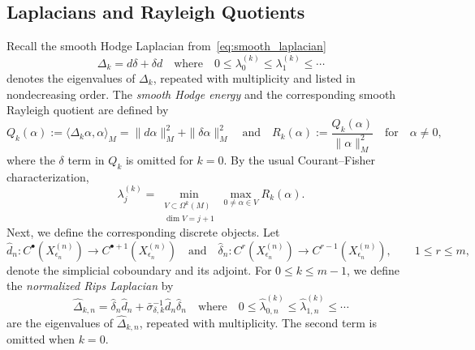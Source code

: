\documentclass[11pt,reqno]{amsproc}
\numberwithin{equation}{section}
\newcommand{\hd}{\hat{d}}
\newcommand{\hdelta}{\hat{\delta}}
\newcommand{\andd}{\quad \text{and} \quad}
\theoremstyle{definition}
\theoremstyle{plain}
\begin{document}
    
    
    


    \subsection{Laplacians and Rayleigh Quotients}

    Recall the smooth Hodge Laplacian from~\eqref{eq:smooth_laplacian}
    \begin{equation}
        \Delta_k=d\delta+\delta d \quad \text{where} \quad 0\leq \lambda^{(k)}_0\leq \lambda^{(k)}_1\leq \cdots
    \end{equation}
    denotes the eigenvalues of $\Delta_k$, repeated with multiplicity and listed in nondecreasing order. The \emph{smooth Hodge energy} and the corresponding smooth Rayleigh quotient are defined by 
    \begin{equation} \label{eq:smooth_rayleigh_sec7}
        Q_k(\alpha)
        := \langle \Delta_k\alpha,\alpha\rangle_M
        = \|d\alpha\|_M^2+\|\delta\alpha\|_M^2 \andd R_k(\alpha):=\frac{Q_k(\alpha)}{\|\alpha\|_M^2} \quad \text{for} \quad  \alpha\neq 0,
    \end{equation}
    \label{not:smooth_rayleigh}
    where the $\delta$ term in $Q_k$ is omitted for $k = 0$.  
    By the usual Courant--Fisher characterization,
    \begin{equation} \label{eq:smooth_minmax_sec7}
        \lambda^{(k)}_j
        =
        \min_{\substack{V\subset \Omega^k(M)\\ \dim V=j+1}}
        \max_{0\neq \alpha\in V} R_k(\alpha).
    \end{equation}
    Next, we define the corresponding discrete objects. Let
    \begin{equation}
        \hd_n:C^\bullet(X^{(n)}_{\epsilon_n})\to C^{\bullet+1}(X^{(n)}_{\epsilon_n})
        \andd
        \hdelta_n : C^r(X^{(n)}_{\epsilon_n}) \to C^{r-1}(X^{(n)}_{\epsilon_n}), \qquad 1\leq r\leq m,
    \end{equation}
    denote the simplicial coboundary and its adjoint.
    For $0\leq k\leq m-1$, we define the \emph{normalized Rips Laplacian} by
    \begin{equation} \label{eq:rips_laplacian}
        \widehat\Delta_{k,n}=\hdelta_n\hd_n+\bar{\sigma}_{\delta,k}^{-1}\hd_n\hdelta_n \quad \text{where} \quad 0\leq \widehat\lambda^{(k)}_{0,n}\leq \widehat\lambda^{(k)}_{1,n}\leq \cdots
    \end{equation}
    are the eigenvalues of $\widehat\Delta_{k,n}$, repeated with multiplicity.  The second term is omitted when $k=0$. 
\end{document}
